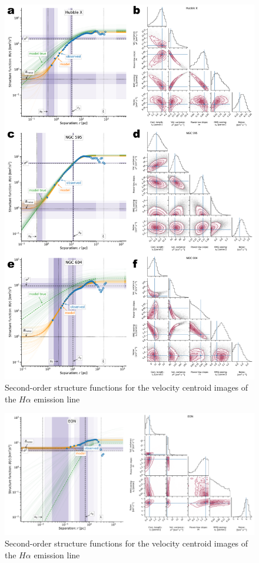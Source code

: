 \documentclass[fleqn,usenatbib, useAMS, a4paper]{mnras}
\begin{document}
\begin{figure}
  \centering
  \includegraphics[width=0.8\linewidth]{Figures/strucfunc-fit-C}
  \caption{Second-order structure functions for the velocity centroid images of the \(H\alpha\) emission line}\label{fig:strucfunc-fit-C}
\end{figure}

\begin{figure}
  \centering
  \includegraphics[width=0.8\linewidth]{Figures/strucfunc-fit-D}
  \caption{Second-order structure functions for the velocity centroid images of the \(H\alpha\) emission line}\label{fig:strucfunc-fit-D}
\end{figure}
\end{document}
